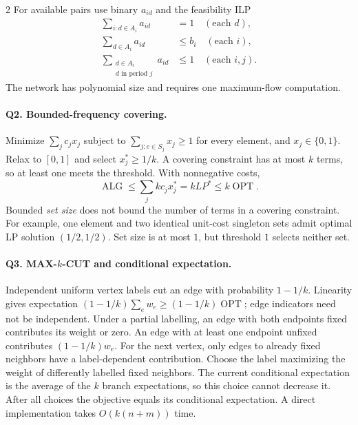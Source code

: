 \documentclass[8pt]{extarticle}
\theoremstyle{definition}
\newcommand{\OPT}{\operatorname{OPT}}
\newcommand{\ALG}{\operatorname{ALG}}
\begin{document}
\begin{multicols*}{2}
For available pairs use binary $a_{id}$ and the feasibility ILP
\[
\begin{aligned}
\sum_{i:d\in A_i}a_{id}&=1\quad(\text{each }d),\\
\sum_{d\in A_i}a_{id}&\le b_i\quad(\text{each }i),\\
\sum_{\substack{d\in A_i\\d\text{ in period }j}}a_{id}&\le1
\quad(\text{each }i,j).
\end{aligned}
\]
The network has polynomial size and requires one maximum-flow computation.

\paragraph{Q2. Bounded-frequency covering.}
Minimize $\sum_j c_jx_j$ subject to
$\sum_{j:e\in S_j}x_j\ge1$ for every element, and $x_j\in\{0,1\}$.
Relax to $[0,1]$ and select $x_j^*\ge1/k$.  A covering constraint has at
most $k$ terms, so at least one meets the threshold.  With nonnegative costs,
\[
\ALG\le\sum_j kc_jx_j^*=kLP^*\le k\OPT.
\]
Bounded \emph{set size} does not bound the number of terms in a covering
constraint.  For example, one element and two identical unit-cost singleton
sets admit optimal LP solution $(1/2,1/2)$.  Set size is at most $1$, but
threshold $1$ selects neither set.

\paragraph{Q3. \texorpdfstring{MAX-$k$-CUT}{MAX-k-CUT} and conditional expectation.}
Independent uniform vertex labels cut an edge with probability $1-1/k$.
Linearity gives expectation $(1-1/k)\sum_e w_e\ge(1-1/k)\OPT$; edge
indicators need not be independent.  Under a partial labelling, an edge
with both endpoints fixed contributes its weight or zero.  An edge with
at least one endpoint unfixed contributes $(1-1/k)w_e$.  For the next
vertex, only edges to already fixed neighbors have a label-dependent
contribution.  Choose the label maximizing the weight of differently
labelled fixed neighbors.  The current conditional expectation is the
average of the $k$ branch expectations, so this choice cannot decrease it.
After all choices the objective equals its conditional expectation.
A direct implementation takes $O(k(n+m))$ time.


\end{multicols*}
\end{document}
